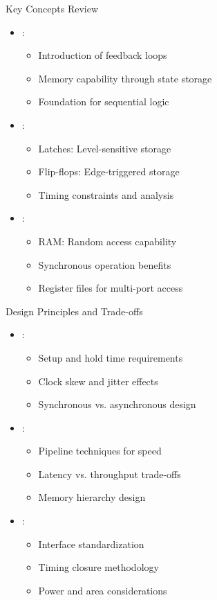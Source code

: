 \begin{frame}{Key Concepts Review}
\begin{itemize}
\item {}:
\begin{itemize}
\item Introduction of feedback loops
\item Memory capability through state storage
\item Foundation for sequential logic
\end{itemize}
\vspace{0.3cm}
\item {}:
\begin{itemize}
\item Latches: Level-sensitive storage
\item Flip-flops: Edge-triggered storage
\item Timing constraints and analysis
\end{itemize}
\vspace{0.3cm}
\item {}:
\begin{itemize}
\item RAM: Random access capability
\item Synchronous operation benefits
\item Register files for multi-port access
\end{itemize}
\end{itemize}
\end{frame}

\begin{frame}{Design Principles and Trade-offs}
\begin{itemize}
\item {}:
\begin{itemize}
\item Setup and hold time requirements
\item Clock skew and jitter effects
\item Synchronous vs. asynchronous design
\end{itemize}
\vspace{0.3cm}
\item {}:
\begin{itemize}
\item Pipeline techniques for speed
\item Latency vs. throughput trade-offs
\item Memory hierarchy design
\end{itemize}
\vspace{0.3cm}
\item {}:
\begin{itemize}
\item Interface standardization
\item Timing closure methodology
\item Power and area considerations
\end{itemize}
\end{itemize}
\end{frame}

